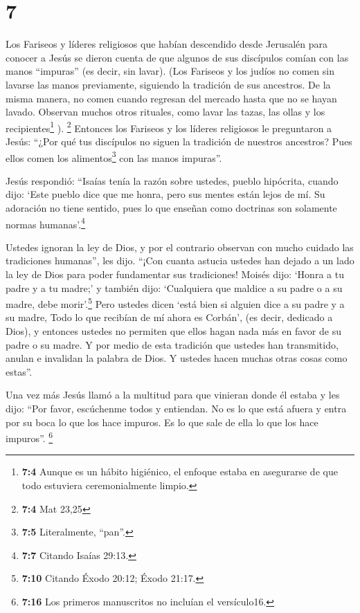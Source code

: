 \hypertarget{section-6}{%
\section{7}\label{section-6}}

 Los Fariseos y líderes religiosos que habían descendido
desde Jerusalén para conocer a Jesús  se dieron cuenta de
que algunos de sus discípulos comían con las manos ``impuras'' (es
decir, sin lavar).  (Los Fariseos y los judíos no comen
sin lavarse las manos previamente, siguiendo la tradición de sus
ancestros.  De la misma manera, no comen cuando regresan
del mercado hasta que no se hayan lavado. Observan muchos otros
rituales, como lavar las tazas, las ollas y los recipientes\footnote{\textbf{7:4}
  Aunque es un hábito higiénico, el enfoque estaba en asegurarse de que
  todo estuviera ceremonialmente limpio.} ). \footnote{\textbf{7:4} Mat
  23,25}  Entonces los Fariseos y los líderes religiosos
le preguntaron a Jesús: ``¿Por qué tus discípulos no siguen la tradición
de nuestros ancestros? Pues ellos comen los alimentos\footnote{\textbf{7:5}
  Literalmente, ``pan''.} con las manos impuras''.

 Jesús respondió: ``Isaías tenía la razón sobre ustedes,
pueblo hipócrita, cuando dijo: `Este pueblo dice que me honra, pero sus
mentes están lejos de mí.  Su adoración no tiene sentido,
pues lo que enseñan como doctrinas son solamente normas
humanas'.\footnote{\textbf{7:7} Citando Isaías 29:13.}

 Ustedes ignoran la ley de Dios, y por el contrario
observan con mucho cuidado las tradiciones humanas'', les dijo.
 ``¡Con cuanta astucia ustedes han dejado a un lado la ley
de Dios para poder fundamentar sus tradiciones!  Moisés
dijo: `Honra a tu padre y a tu madre;' y también dijo: `Cualquiera que
maldice a su padre o a su madre, debe morir'.\footnote{\textbf{7:10}
  Citando Éxodo 20:12; Éxodo 21:17.}  Pero ustedes dicen
`está bien si alguien dice a su padre y a su madre, Todo lo que recibían
de mí ahora es Corbán', (es decir, dedicado a Dios),  y
entonces ustedes no permiten que ellos hagan nada más en favor de su
padre o su madre.  Y por medio de esta tradición que
ustedes han transmitido, anulan e invalidan la palabra de Dios. Y
ustedes hacen muchas otras cosas como estas''.

 Una vez más Jesús llamó a la multitud para que vinieran
donde él estaba y les dijo: ``Por favor, escúchenme todos y entiendan.
 No es lo que está afuera y entra por su boca lo que los
hace impuros. Es lo que sale de ella lo que los hace impuros''.
 \footnote{\textbf{7:16} Los primeros manuscritos no
  incluían el versículo16.}

